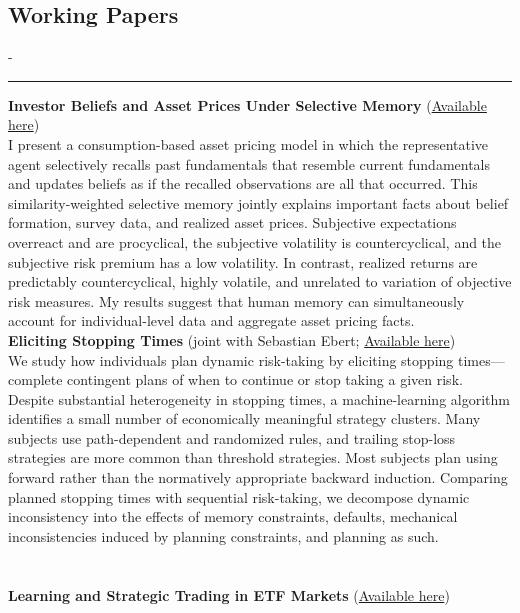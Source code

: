 \documentclass{res}
\newcommand{\sectionline}{	\vspace{-8pt}
	{\parindent-\sectionwidth \rule{\resumewidth}{0.4pt}} }
\begin{document}
\begin{resume}
\section{Working Papers} 	
	\sectionline
    \textbf{Investor Beliefs and Asset Prices Under Selective Memory} (\href{http://maxvoigt.github.io/files/Voigt25_BeliefsAssetPrices.pdf}{Available here}) \\
	I present a consumption-based asset pricing model in which the representative agent selectively recalls past fundamentals that resemble current fundamentals and updates beliefs as if the recalled observations are all that occurred. This similarity-weighted selective memory jointly explains important facts about belief formation, survey data, and realized asset prices. Subjective expectations overreact and are procyclical, the subjective volatility is countercyclical, and the subjective risk premium has a low volatility. In contrast, realized returns are predictably countercyclical, highly volatile, and unrelated to variation of objective risk measures. My results suggest that human memory can simultaneously account for individual-level data and aggregate asset pricing facts.
	\medskip
	\\
    \textbf{Eliciting Stopping Times} (joint with Sebastian Ebert; \href{https://papers.ssrn.com/sol3/papers.cfm?abstract_id=4526931}{Available here})\\
    We study how individuals plan dynamic risk-taking by eliciting stopping times—complete contingent plans of when to continue or stop taking a given risk. Despite substantial heterogeneity in stopping times, a machine-learning algorithm identifies a small number of economically meaningful strategy clusters. Many subjects use path-dependent and randomized rules, and trailing stop-loss strategies are more common than threshold strategies. Most subjects plan using forward rather than the normatively appropriate backward induction. Comparing planned stopping times with sequential risk-taking, we decompose dynamic inconsistency into the effects of memory constraints, defaults, mechanical inconsistencies induced by planning constraints, and planning as such.
	\medskip
    \\ \\ \\
    \textbf{Learning and Strategic Trading in ETF Markets} (\href{http://maxvoigt.github.io/files/Voigt2023_ETFMarkets.pdf}{Available here}) \\

\end{resume}
\end{document}
